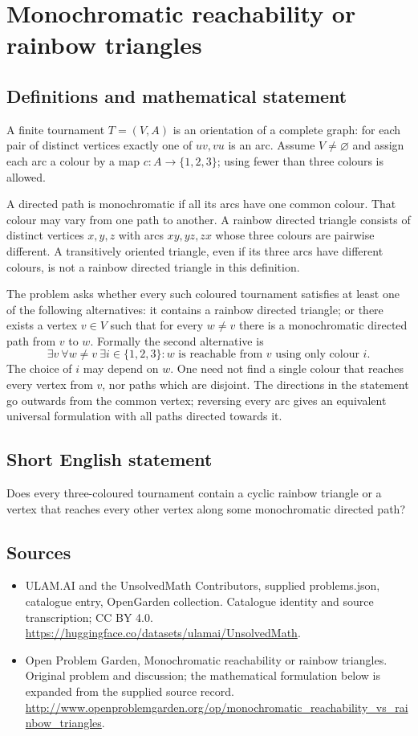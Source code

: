\documentclass[11pt,a4paper]{article}
\begin{document}
\section*{Monochromatic reachability or rainbow triangles}\label{statement}

\subsection{Definitions and mathematical statement}
A finite tournament $T=(V,A)$ is an orientation of a complete graph:
for each pair of distinct vertices exactly one of $uv,vu$ is an arc.
Assume $V\ne\varnothing$ and assign each arc a colour by a map
$c:A\to\{1,2,3\}$; using fewer than three colours is allowed.

A directed path is monochromatic if all its arcs have one common
colour. That colour may vary from one path to another. A rainbow
directed triangle consists of distinct vertices $x,y,z$ with arcs
$xy,yz,zx$ whose three colours are pairwise different. A transitively
oriented triangle, even if its three arcs have different colours,
is not a rainbow directed triangle in this definition.

The problem asks whether every such coloured tournament satisfies at
least one of the following alternatives: it contains a rainbow
directed triangle; or there exists a vertex $v\in V$ such that for
every $w\ne v$ there is a monochromatic directed path from $v$ to $w$.
Formally the second alternative is
\[
 \exists v\ \forall w\ne v\ \exists i\in\{1,2,3\}:
          w\text{ is reachable from }v\text{ using only colour }i.
\]
The choice of $i$ may depend on $w$. One need not find a single colour
that reaches every vertex from $v$, nor paths which are disjoint.
The directions in the statement go outwards from the common vertex;
reversing every arc gives an equivalent universal formulation with
all paths directed towards it.
\subsection{Short English statement}
Does every three-coloured tournament contain a cyclic rainbow triangle or a vertex that reaches every other vertex along some monochromatic directed path?
\subsection{Sources}
\begin{itemize}
\item[S1] ULAM.AI and the UnsolvedMath Contributors, supplied problems.json, catalogue entry, OpenGarden collection. Catalogue identity and source transcription; CC BY 4.0.
\url{https://huggingface.co/datasets/ulamai/UnsolvedMath}.
\item[S2] Open Problem Garden, Monochromatic reachability or rainbow triangles. Original problem and discussion; the mathematical formulation below is expanded from the supplied source record.
\url{http://www.openproblemgarden.org/op/monochromatic_reachability_vs_rainbow_triangles}.
\end{itemize}
\end{document}
